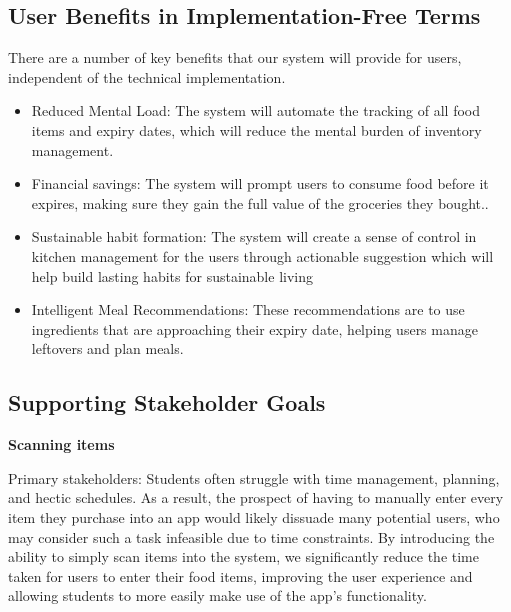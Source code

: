\subsection{User Benefits in Implementation-Free Terms}
\par
There are a number of key benefits that our system will provide for users, independent of the technical implementation.
\begin{itemize}
\item Reduced Mental Load: The system will automate the tracking of all food items and expiry dates, which will reduce the mental burden of inventory management.
\item Financial savings: The system will prompt users to consume food before it expires, making sure they gain the full value of the groceries they bought..
\item Sustainable habit formation: The system will create a sense of control in kitchen management for the users through actionable suggestion which will help build lasting habits for sustainable living
\item Intelligent Meal Recommendations: These recommendations are to use ingredients that are approaching their expiry date, helping users manage leftovers and plan meals.
\end{itemize}
\newpage
\subsection{Supporting Stakeholder Goals}
\textbf{Scanning items}
\par
Primary stakeholders: Students often struggle with time management, planning, and hectic schedules. As a result, the prospect of having to manually enter every item they purchase into an app would likely dissuade many potential users, who may consider such a task infeasible due to time constraints. By introducing the ability to simply scan items into the system, we significantly reduce the time taken for users to enter their food items, improving the user experience and allowing students to more easily make use of the app’s functionality.

